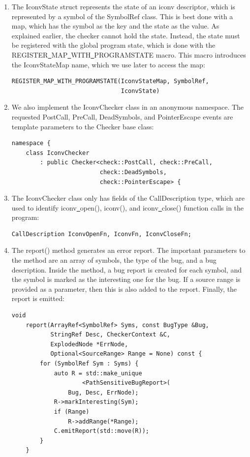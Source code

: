 \begin{enumerate}
\item The IconvState struct represents the state of an iconv descriptor, which is represented by a symbol of the SymbolRef class. This is best done with a map, which has the symbol as the key and the state as the value. As explained earlier, the checker cannot hold the state. Instead, the state must be registered with the global program state, which is done with the REGISTER\underline{~}MAP\underline{~}WITH\underline{~}PROGRAMSTATE macro. This macro introduces the IconvStateMap name, which we use later to access the map:
\begin{lstlisting}[caption={}]
REGISTER_MAP_WITH_PROGRAMSTATE(IconvStateMap, SymbolRef,
							   IconvState)
\end{lstlisting}

\item We also implement the IconvChecker class in an anonymous namespace. The requested PostCall, PreCall, DeadSymbols, and PointerEscape events are template parameters to the Checker base class:
\begin{lstlisting}[caption={}]
namespace {
	class IconvChecker
		: public Checker<check::PostCall, check::PreCall,
						 check::DeadSymbols,
						 check::PointerEscape> {
\end{lstlisting}

\item The IconvChecker class only has fields of the CallDescription type, which are used to identify iconv\underline{~}open(), iconv(), and iconv\underline{~}close() function calls in the program:
\begin{lstlisting}[caption={}]
	CallDescription IconvOpenFn, IconvFn, IconvCloseFn;
\end{lstlisting}

\item The report() method generates an error report. The important parameters to the method are an array of symbols, the type of the bug, and a bug description. Inside the method, a bug report is created for each symbol, and the symbol is marked as the interesting one for the bug. If a source range is provided as a parameter, then this is also added to the report. Finally, the report is emitted:
\begin{lstlisting}[caption={}]
	void
	report(ArrayRef<SymbolRef> Syms, const BugType &Bug,
		   StringRef Desc, CheckerContext &C,
		   ExplodedNode *ErrNode,
		   Optional<SourceRange> Range = None) const {
		for (SymbolRef Sym : Syms) {
			auto R = std::make_unique
					<PathSensitiveBugReport>(
				Bug, Desc, ErrNode);
			R->markInteresting(Sym);
			if (Range)
				R->addRange(*Range);
			C.emitReport(std::move(R));
		}
	}
\end{lstlisting}


\end{enumerate}
